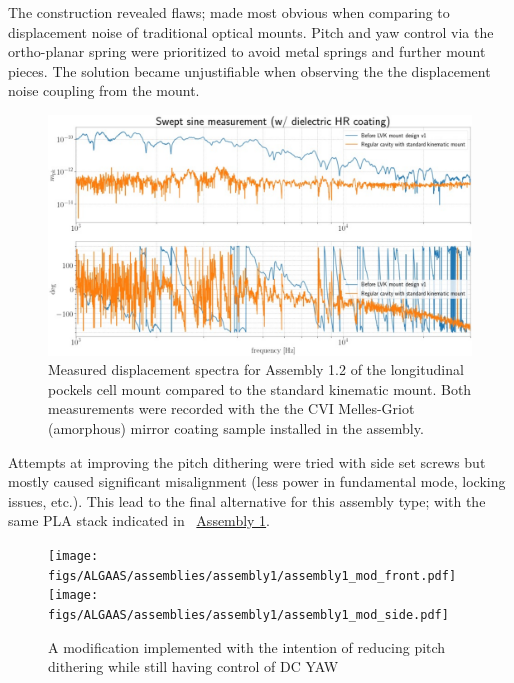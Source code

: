 The construction revealed flaws; made most obvious when comparing to displacement noise of traditional optical mounts. Pitch and yaw control via the ortho-planar spring were prioritized to avoid metal springs and further mount pieces. The solution became unjustifiable when observing the the displacement noise coupling from the mount.


\begin{figure}[H]
\centering
\includegraphics[width=\textwidth]{figs/ALGAAS/assemblies/assembly1/assembly1_2_compare_standmount.pdf}
\caption{Measured displacement spectra for Assembly 1.2 of the longitudinal pockels cell mount compared to the standard kinematic mount. Both measurements were recorded with the the CVI Melles-Griot (amorphous) mirror coating sample installed in the assembly.}
\label{fig:A12cmpkinmnt}
\end{figure}


Attempts at improving the pitch dithering were tried with side set screws but mostly caused significant misalignment (less power in fundamental mode, locking issues, etc.). This lead to the final alternative for this assembly type; with the same PLA stack indicated in ~\hyperref[fig:A1pt0]{Assembly 1}.

\begin{figure}[!ht]
	\begin{subcaptiongroup}
		\texttt{[image: figs/ALGAAS/assemblies/assembly1/assembly1\_mod\_front.pdf]}
		\label{A1front}
		\texttt{[image: figs/ALGAAS/assemblies/assembly1/assembly1\_mod\_side.pdf]}
		\label{A1side}
	\end{subcaptiongroup}
    \caption{A modification implemented  with the intention of reducing pitch dithering while still having control of DC YAW}
    \label{fig:A1pt0mod}
\end{figure}

